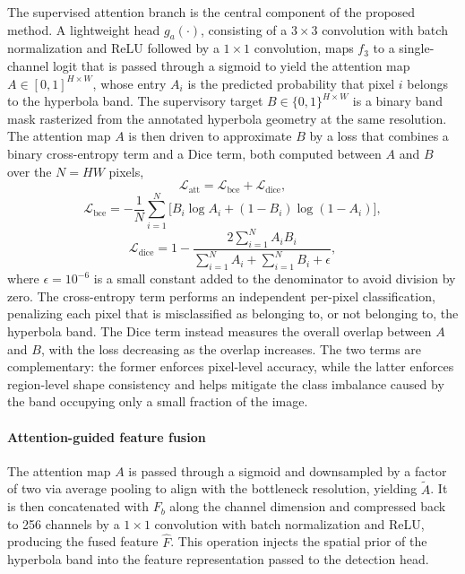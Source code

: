 \documentclass[lettersize,journal]{IEEEtran}
\begin{document}
The supervised attention branch is the central component of the proposed method. 
A lightweight head $g_a(\cdot)$, consisting of a $3\times3$ convolution with batch normalization 
and ReLU followed by a $1\times1$ convolution, maps $f_3$ to a single-channel logit 
that is passed through a sigmoid to yield the attention map $A\in[0,1]^{H\times W}$,
whose entry $A_i$ is the predicted probability that pixel $i$ belongs to the hyperbola band.
The supervisory target $B\in\{0,1\}^{H\times W}$ is a binary band mask rasterized from the annotated hyperbola geometry at the same resolution.
The attention map $A$ is then driven to approximate $B$ by a loss that combines a binary cross-entropy term and a Dice term, both computed between $A$ and $B$ over the $N=HW$ pixels,
\begin{equation}
\mathcal{L}_{\mathrm{att}} = \mathcal{L}_{\mathrm{bce}} + \mathcal{L}_{\mathrm{dice}},
\end{equation}
\begin{equation}
\mathcal{L}_{\mathrm{bce}} = -\frac{1}{N}\sum_{i=1}^{N}\Big[B_i\log A_i + (1-B_i)\log(1-A_i)\Big],
\end{equation}
\begin{equation}
\mathcal{L}_{\mathrm{dice}} = 1 - \frac{2\sum_{i=1}^{N} A_i B_i}{\sum_{i=1}^{N} A_i + \sum_{i=1}^{N} B_i + \epsilon},
\end{equation}
where $\epsilon=10^{-6}$ is a small constant added to the denominator to avoid division by zero.
The cross-entropy term performs an independent per-pixel classification, penalizing each pixel that is misclassified as belonging to, or not belonging to, the hyperbola band.
The Dice term instead measures the overall overlap between $A$ and $B$, with the loss decreasing as the overlap increases.
The two terms are complementary: the former enforces pixel-level accuracy, 
while the latter enforces region-level shape consistency 
and helps mitigate the class imbalance caused by the band occupying only a small fraction of the image.

\paragraph{Attention-guided feature fusion}
The attention map $A$ is passed through a sigmoid and downsampled by a factor of two via average pooling 
to align with the bottleneck resolution, yielding $\tilde{A}$. 
It is then concatenated with $F_b$ along the channel dimension 
and compressed back to 256 channels by a $1\times1$ convolution with batch normalization and ReLU, 
producing the fused feature $\hat{F}$. 
This operation injects the spatial prior of the hyperbola band into the feature representation passed to the detection head.
\end{document}
